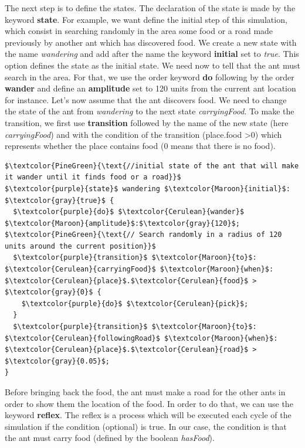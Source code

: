 \documentclass[12pt, a4paper]{memoir} %
\begin{document}
			The next step is to define the states. The declaration of the state is made by the keyword \textbf{state}.
			For example, we want define the initial step of this simulation, which consist in searching randomly in the
			area some food or a road made previously by another ant which has discovered food. We create a new state with
			the name \textit{wandering} and add after the name the keyword \textbf{initial} set to \textit{true}.
			This option defines the state as the initial state. We need now to tell that the ant must search in the area.
			For that, we use the order keyword \textbf{do} following by the order \textbf{wander} and define an \textbf{amplitude}
			set to 120 units from the current ant location for instance. Let's now assume that the ant discovers food.
			We need to change the state of the ant from \textit{wandering} to the next state \textit{carryingFood}. To make the
			transition, we first use \textbf{transition} followed by the name of the new state (here \textit{carryingFood}) and with
			the condition of the transition (place.food \textgreater 0) which represents whether the place contains food (0 means that there is no food).

			\begin{lstlisting}[mathescape,caption=Initial state of the FSM.,label=code:initstate]
$\textcolor{PineGreen}{\text{//initial state of the ant that will make it wander until it finds food or a road}}$
$\textcolor{purple}{state}$ wandering $\textcolor{Maroon}{initial}$: $\textcolor{gray}{true}$ {
  $\textcolor{purple}{do}$ $\textcolor{Cerulean}{wander}$ $\textcolor{Maroon}{amplitude}$:$\textcolor{gray}{120}$; $\textcolor{PineGreen}{\text{// Search randomly in a radius of 120 units around the current position}}$
  $\textcolor{purple}{transition}$ $\textcolor{Maroon}{to}$: $\textcolor{Cerulean}{carryingFood}$ $\textcolor{Maroon}{when}$: $\textcolor{Cerulean}{place}$.$\textcolor{Cerulean}{food}$ > $\textcolor{gray}{0}$ {
    $\textcolor{purple}{do}$ $\textcolor{Cerulean}{pick}$;
  }
  $\textcolor{purple}{transition}$ $\textcolor{Maroon}{to}$: $\textcolor{Cerulean}{followingRoad}$ $\textcolor{Maroon}{when}$: $\textcolor{Cerulean}{place}$.$\textcolor{Cerulean}{road}$ > $\textcolor{gray}{0.05}$;
}
			\end{lstlisting}

			Before bringing back the food, the ant must make a road for the other ants in order to show them the location of the food.
			In order to do that, we can use the keyword \textbf{reflex}. The reflex is a process which will be executed each cycle of
			the simulation if the condition (optional) is true. In our case, the condition is that the ant must carry food (defined by the boolean
			\textit{hasFood}).
\end{document}
